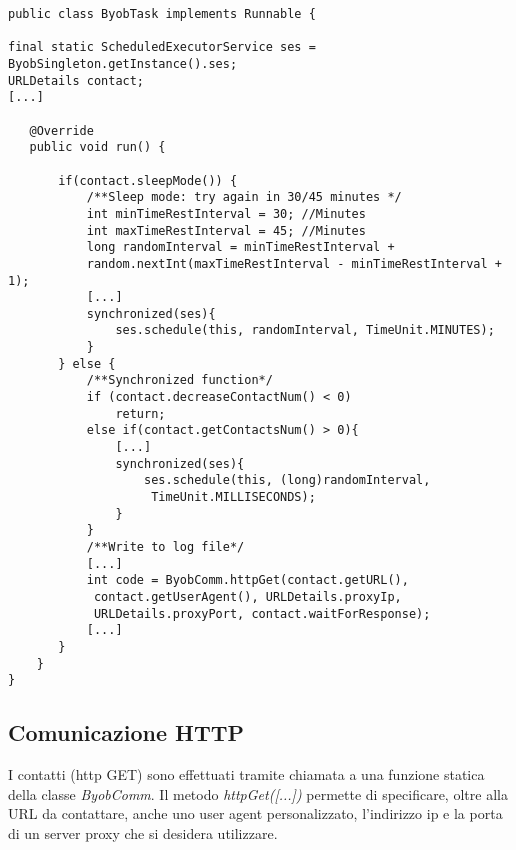 \vspace{0.5cm}
\begin{lstlisting}
public class ByobTask implements Runnable {

final static ScheduledExecutorService ses = ByobSingleton.getInstance().ses;
URLDetails contact;
[...]

   @Override
   public void run() {
   
	   if(contact.sleepMode()) {
		   /**Sleep mode: try again in 30/45 minutes */
		   int minTimeRestInterval = 30; //Minutes
		   int maxTimeRestInterval = 45; //Minutes
		   long randomInterval = minTimeRestInterval + 
		   random.nextInt(maxTimeRestInterval - minTimeRestInterval + 1);
		   [...]
		   synchronized(ses){
			   ses.schedule(this, randomInterval, TimeUnit.MINUTES);
		   }
	   } else {        
		   /**Synchronized function*/
		   if (contact.decreaseContactNum() < 0) 
			   return; 
		   else if(contact.getContactsNum() > 0){
			   [...]
			   synchronized(ses){
				   ses.schedule(this, (long)randomInterval,
				    TimeUnit.MILLISECONDS);
			   }
		   }
		   /**Write to log file*/
		   [...]
		   int code = ByobComm.httpGet(contact.getURL(),
		    contact.getUserAgent(), URLDetails.proxyIp, 
		    URLDetails.proxyPort, contact.waitForResponse);
	       [...]
	   }
	}
}
\end{lstlisting}

\subsection{Comunicazione HTTP}
I contatti (http GET) sono effettuati tramite chiamata a una funzione statica della classe \textit{ByobComm}.
Il metodo \textit{httpGet([...])} permette di specificare, oltre alla URL da contattare, anche uno user agent personalizzato, l'indirizzo ip e la porta di un server proxy che si desidera utilizzare.

